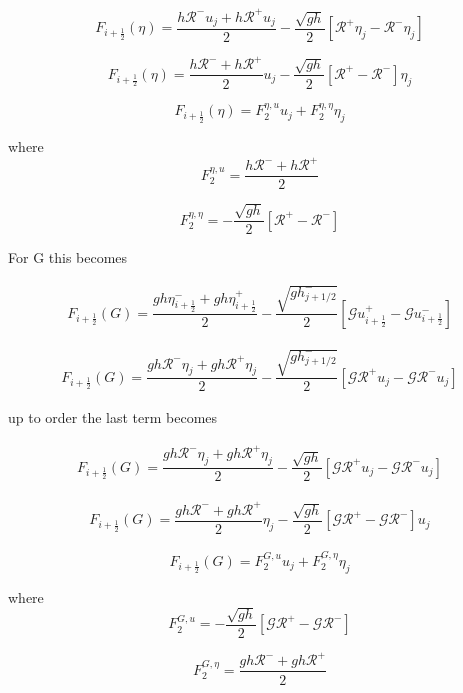 \documentclass[12pt]{article}
\begin{document}
\[F_{i+\frac{1}{2}}(\eta) = \dfrac{ h\mathcal{R}^-u_{j}+ h\mathcal{R}^+u_{j}}{ 2}  - \dfrac{ \sqrt{g h}}{ 2} \left [ \mathcal{R}^+\eta_{j} - \mathcal{R}^-\eta_{j} \right ]\]

\[F_{i+\frac{1}{2}}(\eta) = \dfrac{ h\mathcal{R}^-+ h\mathcal{R}^+}{ 2} u_{j} - \dfrac{ \sqrt{g h}}{ 2} \left [ \mathcal{R}^+ - \mathcal{R}^- \right ] \eta_{j}\]

\[F_{i+\frac{1}{2}}(\eta) = F^{\eta,u}_2 u_{j} + F^{\eta,\eta}_2 \eta_{j}\]

where
\[ F^{\eta,u}_2 = \dfrac{ h\mathcal{R}^-+ h\mathcal{R}^+}{ 2}\]

\[ F^{\eta,\eta}_2 = -\dfrac{ \sqrt{g h}}{ 2} \left [ \mathcal{R}^+ - \mathcal{R}^- \right ]\]

For G this becomes

\begin{multline}
F_{i+\frac{1}{2}}(G) = \dfrac{ gh\eta^-_{i+\frac{1}{2}} + gh\eta^+_{i+\frac{1}{2}}}{ 2}  - \dfrac{ \sqrt{g h^-_{j + 1/2}}}{ 2} \left [ \mathcal{G}u^+_{i+\frac{1}{2}} - \mathcal{G}u^-_{i+\frac{1}{2}} \right ]
\end{multline}

\begin{multline}
F_{i+\frac{1}{2}}(G) = \dfrac{ gh\mathcal{R}^-\eta_{j} + gh\mathcal{R}^+\eta_{j}}{ 2}  - \dfrac{ \sqrt{g h^-_{j + 1/2}}}{ 2} \left [ \mathcal{G}\mathcal{R}^+u_{j} - \mathcal{G}\mathcal{R}^-u_{j} \right ]
\end{multline}

up to order the last term becomes

\begin{multline}
F_{i+\frac{1}{2}}(G) = \dfrac{ gh\mathcal{R}^-\eta_{j} + gh\mathcal{R}^+\eta_{j}}{ 2}  - \dfrac{ \sqrt{g h}}{ 2} \left [ \mathcal{G}\mathcal{R}^+u_{j} - \mathcal{G}\mathcal{R}^-u_{j} \right ]
\end{multline}

\begin{multline}
F_{i+\frac{1}{2}}(G) = \dfrac{ gh\mathcal{R}^- + gh\mathcal{R}^+}{ 2} \eta_{j}  - \dfrac{ \sqrt{g h}}{ 2} \left [ \mathcal{G}\mathcal{R}^+ - \mathcal{G}\mathcal{R}^- \right ]u_{j}
\end{multline}

\[F_{i+\frac{1}{2}}(G) = F^{G,u}_2 u_{j} + F^{G,\eta}_2 \eta_{j}\]

where
\[ F^{G,u}_2 = - \dfrac{ \sqrt{g h}}{ 2} \left [ \mathcal{G}\mathcal{R}^+ - \mathcal{G}\mathcal{R}^- \right ]\]

\[ F^{G,\eta}_2 = \dfrac{ gh\mathcal{R}^- + gh\mathcal{R}^+}{ 2}\]
\end{document}
